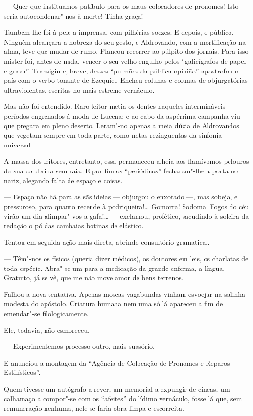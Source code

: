 --- Quer que instituamos patíbulo para os maus colocadores de pronomes!
Isto seria autocondenar"-nos à morte! Tinha graça!

Também lhe foi à pele a imprensa, com pilhérias soezes. E depois, o
público. Ninguém alcançara a nobreza do seu gesto, e Aldrovando, com a
mortificação na alma, teve que mudar de rumo. Planeou recorrer ao
púlpito dos jornais. Para isso mister foi, antes de nada, vencer o seu
velho engulho pelos ``galicígrafos de papel e graxa''. Transigiu e,
breve, desses ``pulmões da pública opinião'' apostrofou o país com o
verbo tonante de Ezequiel. Encheu colunas e colunas de objurgatórias
ultraviolentas, escritas no mais estreme vernáculo.

Mas não foi entendido. Raro leitor metia os dentes naqueles
intermináveis períodos engrenados à moda de Lucena; e ao cabo da
aspérrima campanha viu que pregara em pleno deserto. Leram"-no apenas a
meia dúzia de Aldrovandos que vegetam sempre em toda parte, como notas
rezinguentas da sinfonia universal.

A massa dos leitores, entretanto, essa permaneceu alheia aos flamívomos
pelouros da sua colubrina sem raia. E por fim os ``periódicos''
fecharam"-lhe a porta no nariz, alegando falta de espaço e coisas.

--- Espaço não há para as sãs ideias --- objurgou o enxotado ---, mas
sobeja, e pressuroso, para quanto recende à podriqueira!\ldots{} Gomorra!
Sodoma! Fogos do céu virão um dia alimpar"-vos a gafa!\ldots{} --- exclamou,
profético, sacudindo à soleira da redação o pó das cambaias botinas de
elástico.

Tentou em seguida ação mais direta, abrindo consultório gramatical.

--- Têm"-nos os físicos (queria dizer médicos), os doutores em leis, os
charlatas de toda espécie. Abra"-se um para a medicação da grande
enferma, a língua. Gratuito, já se vê, que me não move amor de bens
terrenos.

Falhou a nova tentativa. Apenas moscas vagabundas vinham esvoejar na
salinha modesta do apóstolo. Criatura humana nem uma só lá apareceu a
fim de emendar"-se filologicamente.

Ele, todavia, não esmoreceu.

--- Experimentemos processo outro, mais suasório.

E anunciou a montagem da ``Agência de Colocação de Pronomes e Reparos
Estilísticos''.

Quem tivesse um autógrafo a rever, um memorial a expungir de cincas, um
calhamaço a compor"-se com os ``afeites'' do lídimo vernáculo, fosse lá
que, sem remuneração nenhuma, nele se faria obra limpa e escorreita.

